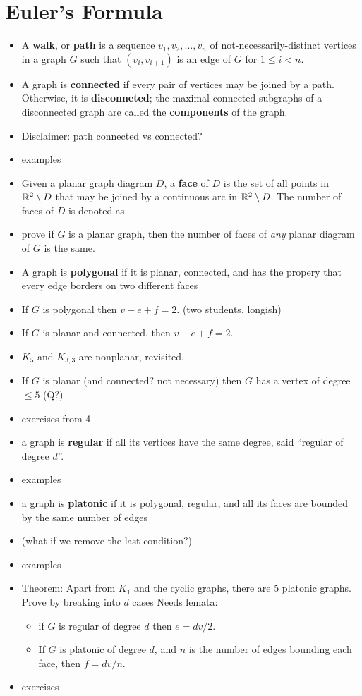 \section{Euler's Formula}
\begin{itemize}
    \item A \textbf{walk}, or \textbf{path} is a sequence $v_1, v_2, \ldots, v_n$ of not-necessarily-distinct vertices in a graph $G$ such that $(v_i, v_{i+1})$ is an edge of $G$ for $1\leq i <n$.
    \item A graph is \textbf{connected} if every pair of vertices may be joined by a path.  Otherwise, it is \textbf{disconneted}; the maximal connected subgraphs of a disconnected graph are called the \textbf{components} of the graph. 
    \item Disclaimer: path connected vs connected?
    \item examples
    \item Given a planar graph diagram $D$, a \textbf{face} of $D$ is the set of all points in $\mathbb{R}^2 \setminus D$ that may be joined by a continuous arc in $\mathbb{R}^2 \setminus D$.  The number of faces of $D$ is denoted as
    \item prove if $G$ is a planar graph, then the number of faces of \textit{any} planar diagram of $G$ is the same.
    \item A graph is \textbf{polygonal} if it is planar, connected, and has the propery that every edge borders on two different faces
    \item If $G$ is polygonal then $v-e+f = 2$. (two students, longish)
    \item If $G$ is planar and connected, then $v-e+f = 2$.
    \item $K_5$ and $K_{3,3}$ are nonplanar, revisited.
    \item If $G$ is planar (and connected? not necessary) then $G$ has a vertex of degree $\leq 5$ (Q?)
    \item exercises from 4
    \item a graph is \textbf{regular} if all its vertices have the same degree, said ``regular of degree $d$''.
    \item examples
    \item a graph is \textbf{platonic} if it is polygonal, regular, and all its faces are bounded by the same number of edges
    \item (what if we remove the last condition?)
    \item examples
    \item Theorem: Apart from $K_1$ and the cyclic graphs, there are 5 platonic graphs.  Prove by breaking into $d$ cases Needs lemata:
    \begin{itemize}
        \item if $G$ is regular of degree $d$ then $e=dv/2$.
        \item If $G$ is platonic of degree $d$, and $n$ is the number of edges bounding each face, then $f = dv/n$.
    \end{itemize}
    \item exercises
\end{itemize}

